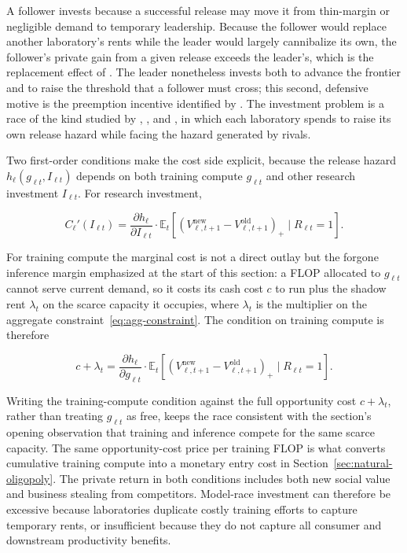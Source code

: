 \documentclass[11pt]{article}
\begin{document}
A follower invests because a successful release may move it from thin-margin or negligible demand to temporary leadership. Because the follower would replace another laboratory's rents while the leader would largely cannibalize its own, the follower's private gain from a given release exceeds the leader's, which is the replacement effect of \citet{arrow1962}. The leader nonetheless invests both to advance the frontier and to raise the threshold that a follower must cross; this second, defensive motive is the preemption incentive identified by \citet{gilbertNewbery1982}. The investment problem is a race of the kind studied by \citet{loury1979}, \citet{leeWilde1980}, and \citet{reinganum1983}, in which each laboratory spends to raise its own release hazard while facing the hazard generated by rivals.

Two first-order conditions make the cost side explicit, because the release hazard $h_\ell(g_{\ell t},I_{\ell t})$ depends on both training compute $g_{\ell t}$ and other research investment $I_{\ell t}$. For research investment,

\begin{equation}C_\ell'(I_{\ell t})=\frac{\partial h_\ell}{\partial I_{\ell t}}\cdot\mathbb E_t\left[\left(V_{\ell,t+1}^{\mathrm{new}}-V_{\ell,t+1}^{\mathrm{old}}\right)_+\mid R_{\ell t}=1\right].\end{equation}

For training compute the marginal cost is not a direct outlay but the forgone inference margin emphasized at the start of this section: a FLOP allocated to $g_{\ell t}$ cannot serve current demand, so it costs its cash cost $c$ to run plus the shadow rent $\lambda_t$ on the scarce capacity it occupies, where $\lambda_t$ is the multiplier on the aggregate constraint~\eqref{eq:agg-constraint}. The condition on training compute is therefore

\begin{equation}c+\lambda_t=\frac{\partial h_\ell}{\partial g_{\ell t}}\cdot\mathbb E_t\left[\left(V_{\ell,t+1}^{\mathrm{new}}-V_{\ell,t+1}^{\mathrm{old}}\right)_+\mid R_{\ell t}=1\right].\end{equation}

Writing the training-compute condition against the full opportunity cost $c+\lambda_t$, rather than treating $g_{\ell t}$ as free, keeps the race consistent with the section's opening observation that training and inference compete for the same scarce capacity. The same opportunity-cost price per training FLOP is what converts cumulative training compute into a monetary entry cost in Section~\ref{sec:natural-oligopoly}. The private return in both conditions includes both new social value and business stealing from competitors. Model-race investment can therefore be excessive because laboratories duplicate costly training efforts to capture temporary rents, or insufficient because they do not capture all consumer and downstream productivity benefits.
\end{document}
